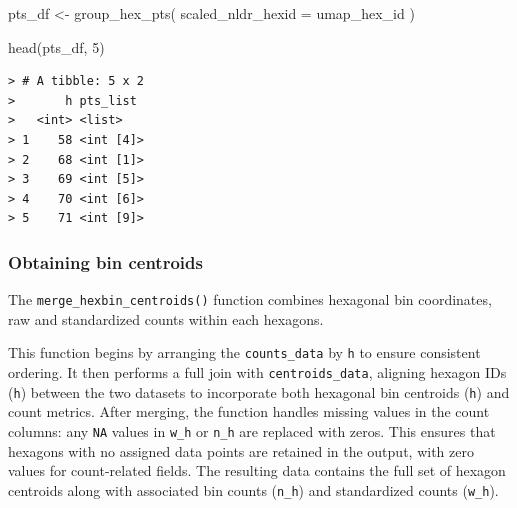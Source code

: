 \documentclass[
  11pt,
  a4paper,
]{report}
\newenvironment{Shaded}{\begin{snugshade}}{\end{snugshade}}
\newcommand{\AttributeTok}[1]{\textcolor[rgb]{0.40,0.45,0.13}{#1}}
\newcommand{\DecValTok}[1]{\textcolor[rgb]{0.68,0.00,0.00}{#1}}
\newcommand{\FunctionTok}[1]{\textcolor[rgb]{0.28,0.35,0.67}{#1}}
\newcommand{\NormalTok}[1]{\textcolor[rgb]{0.00,0.23,0.31}{#1}}
\newcommand{\OtherTok}[1]{\textcolor[rgb]{0.00,0.23,0.31}{#1}}
\newcommand{\SpecialCharTok}[1]{\textcolor[rgb]{0.37,0.37,0.37}{#1}}
\begin{document}
\begin{Shaded}
\begin{Highlighting}[]
\NormalTok{pts\_df }\OtherTok{\textless{}{-}} \FunctionTok{group\_hex\_pts}\NormalTok{(}
  \AttributeTok{scaled\_nldr\_hexid =}\NormalTok{ umap\_hex\_id}
\NormalTok{  )}

\FunctionTok{head}\NormalTok{(pts\_df, }\DecValTok{5}\NormalTok{)}
\end{Highlighting}
\end{Shaded}

\begin{verbatim}
> # A tibble: 5 x 2
>       h pts_list 
>   <int> <list>   
> 1    58 <int [4]>
> 2    68 <int [1]>
> 3    69 <int [5]>
> 4    70 <int [6]>
> 5    71 <int [9]>
\end{verbatim}

\subsubsection{Obtaining bin centroids}\label{obtaining-bin-centroids}

The \texttt{merge\_hexbin\_centroids()} function combines hexagonal bin
coordinates, raw and standardized counts within each hexagons.

This function begins by arranging the \texttt{counts\_data} by
\texttt{h} to ensure consistent ordering. It then performs a full join
with \texttt{centroids\_data}, aligning hexagon IDs (\texttt{h}) between
the two datasets to incorporate both hexagonal bin centroids
(\texttt{h}) and count metrics. After merging, the function handles
missing values in the count columns: any \texttt{NA} values in
\texttt{w\_h} or \texttt{n\_h} are replaced with zeros. This ensures
that hexagons with no assigned data points are retained in the output,
with zero values for count-related fields. The resulting data contains
the full set of hexagon centroids along with associated bin counts
(\texttt{n\_h}) and standardized counts (\texttt{w\_h}).

\begin{Shaded}
\end{Shaded}
\end{document}
